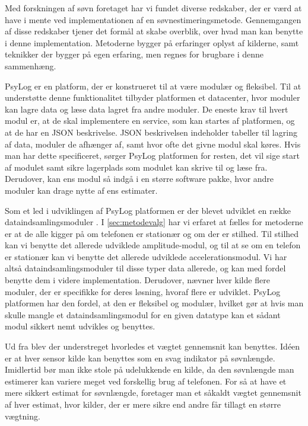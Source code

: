 Med forskningen af søvn foretaget har vi fundet diverse redskaber, der er værd at have i mente ved implementationen af en søvnestimeringsmetode.
Gennemgangen af disse redskaber tjener det formål at skabe overblik, over hvad man kan benytte i denne implementation.
Metoderne bygger på erfaringer oplyst af kilderne, samt teknikker der bygger på egen erfaring, men regnes for brugbare i denne sammenhæng.

\begin{description}[style=nextline]
\item[PsyLog]
PsyLog er en platform, der er konstrueret til at være modulær og fleksibel.
Til at understøtte denne funktionalitet tilbyder platformen et datacenter, hvor moduler kan lagre data og læse data lagret fra andre moduler.
De eneste krav til hvert modul er, at de skal implementere en service, som kan startes af platformen, og at de har en JSON beskrivelse.
JSON beskrivelsen indeholder tabeller til lagring af data, moduler de afhænger af, samt hvor ofte det givne modul skal køres.
Hvis man har dette specificeret, sørger PsyLog platformen for resten, det vil sige start af modulet samt sikre lagerplads som modulet kan skrive til og læse fra.
Derudover, kan ens modul så indgå i en større software pakke, hvor andre moduler kan drage nytte af ens estimater.

\item[Dataindsamlingsmoduler]
Som et led i udviklingen af PsyLog platformen er der blevet udviklet en række dataindsamlingsmoduler \citep{misc:faellesrapp}.
I \cref{sec:metodevalg} har vi erfaret at fælles for metoderne er at de alle kigger på om telefonen er stationær og om der er stilhed. 
Til stilhed kan vi benytte det allerede udviklede amplitude-modul, og til at se om en telefon er stationær kan vi benytte det allerede udviklede accelerationsmodul.
Vi har altså dataindsamlingsmoduler til disse typer data allerede, og kan med fordel benytte dem i videre implementation.
Derudover, nævner hver kilde flere moduler, der er specifikke for deres løsning, hvoraf flere er udviklet.
PsyLog platformen har den fordel, at den er fleksibel og modulær, hvilket gør at hvis man skulle mangle et dataindsamlingsmodul for en given datatype kan et sådant modul sikkert nemt udvikles og benyttes.

\item[Vægtet gennemsnit]
Ud fra \citet{6563918} blev der understreget hvorledes et vægtet gennemsnit kan benyttes.
Idéen er at hver sensor kilde kan benyttes som en svag indikator på søvnlængde.
Imidlertid bør man ikke stole på udelukkende en kilde, da den søvnlængde man estimerer kan variere meget ved forskellig brug af telefonen.
For så at have et mere sikkert estimat for søvnlængde, foretager man et såkaldt vægtet gennemsnit af hver estimat, hvor kilder, der er mere sikre end andre får tillagt en større vægtning.


\end{description}

